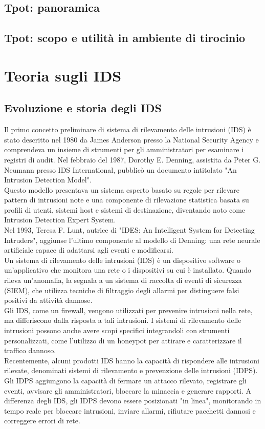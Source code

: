 \documentclass[12pt,a4paper,oneside,onecolumn,openright]{book}
\begin{document}
\subsection{Tpot: panoramica}
\subsection{Tpot: scopo e utilità in ambiente di tirocinio}

\section{Teoria sugli IDS}
\subsection{Evoluzione e storia degli IDS}
Il primo concetto preliminare di sistema di rilevamento delle intrusioni (IDS) 
è stato descritto nel 1980 da James Anderson presso la National Security Agency 
e comprendeva un insieme di strumenti per gli amministratori per esaminare i registri 
di audit. Nel febbraio del 1987, Dorothy E. Denning, assistita da Peter G. Neumann 
presso IDS International, pubblicò un documento intitolato "An Intrusion Detection Model".\\
Questo modello presentava un sistema esperto basato su regole per rilevare pattern 
di intrusioni note e una componente di rilevazione statistica basata su profili di 
utenti, sistemi host e sistemi di destinazione, diventando noto come Intrusion Detection 
Expert System.\\
Nel 1993, Teresa F. Lunt, autrice di "IDES: An Intelligent System for Detecting Intruders", 
aggiunse l'ultimo componente al modello di Denning: una rete neurale artificiale capace di 
adattarsi agli eventi e modificarsi. \\
Un sistema di rilevamento delle intrusioni (IDS) è un dispositivo software o un'applicativo 
che monitora una rete o i dispositivi su cui è installato. Quando rileva un'anomalia, 
la segnala a un sistema di raccolta di eventi di sicurezza (SIEM), che utilizza tecniche 
di filtraggio degli allarmi per distinguere falsi positivi da attività dannose.\\
Gli IDS, come un firewall, vengono utilizzati per prevenire intrusioni nella rete, 
ma differiscono dalla risposta a tali intrusioni. I sistemi di rilevamento delle 
intrusioni possono anche avere scopi specifici integrandoli con strumenti personalizzati, 
come l'utilizzo di un honeypot per attirare e caratterizzare il traffico dannoso.\\
Recentemente, alcuni prodotti IDS hanno la capacità di rispondere alle intrusioni 
rilevate, denominati sistemi di rilevamento e prevenzione delle intrusioni (IDPS). 
Gli IDPS aggiungono la capacità di fermare un attacco rilevato, registrare gli eventi, 
avvisare gli amministratori, bloccare la minaccia e generare rapporti. A differenza 
degli IDS, gli IDPS devono essere posizionati "in linea", monitorando in tempo reale 
per bloccare intrusioni, inviare allarmi, rifiutare pacchetti dannosi e correggere 
errori di rete.\\
\end{document}
